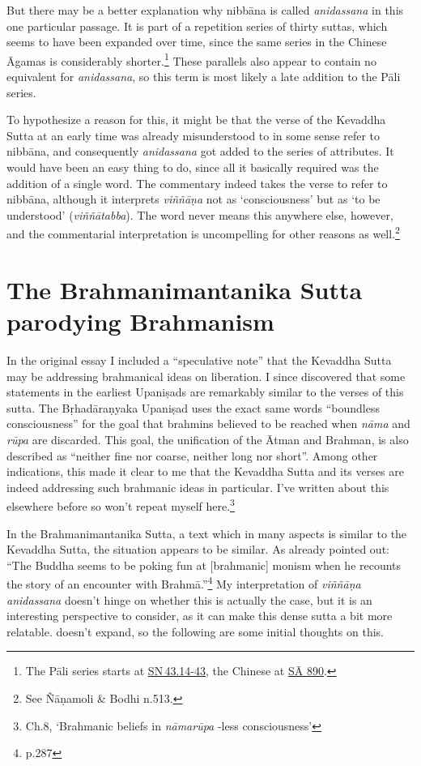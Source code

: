 \documentclass[10pt, openright]{book}
\begin{document}
But there may be a better explanation why nibbāna is called \textit{anidassana} in this one particular passage. It is part of a repetition series of thirty suttas, which seems to have been expanded over time, since the same series in the Chinese Āgamas is considerably shorter.\footnote {The Pāli series starts at \href{https://suttacentral.net/sn43.14-43/en/sujato}{SN 43.14-43}, the Chinese at \href{https://suttacentral.net/Sa890}{SĀ 890}.} These parallels also appear to contain no equivalent for \textit{anidassana}, so this term is most likely a late addition to the Pāli series.


To hypothesize a reason for this, it might be that the verse of the Kevaddha Sutta at an early time was already misunderstood to in some sense refer to nibbāna, and consequently \textit{anidassana} got added to the series of attributes. It would have been an easy thing to do, since all it basically required was the addition of a single word. The commentary indeed takes the verse to refer to nibbāna, although it interprets \textit{viññāṇa} not as ‘consciousness’ but as ‘to be understood’ (\textit{viññātabba}). The word never means this anywhere else, however, and the commentarial interpretation is uncompelling for other reasons as well.\footnote {See Ñāṇamoli \& Bodhi n.513.}




\section{The Brahmanimantanika Sutta parodying Brahmanism}
In the original essay I included a “speculative note” that the Kevaddha Sutta may be addressing brahmanical ideas on liberation. I since discovered that some statements in the earliest Upaniṣads are remarkably similar to the verses of this sutta. The Bṛhadāraṇyaka Upaniṣad uses the exact same words “boundless consciousness” for the goal that brahmins believed to be reached when \textit{nāma} and \textit{rūpa} are discarded. This goal, the unification of the Ātman and Brahman, is also described as “neither fine nor coarse, neither long nor short”. Among other indications, this made it clear to me that the Kevaddha Sutta and its verses are indeed addressing such brahmanic ideas in particular. I’ve written about this elsewhere before so won’t repeat myself here.\footnote {\cite{Sunyo 2024} Ch.8, ‘Brahmanic beliefs in \textit{nāmarūpa} -less consciousness’}


In the Brahmanimantanika Sutta, a text which in many aspects is similar to the Kevaddha Sutta, the situation appears to be similar. As \cite{Reat} already pointed out: “The Buddha seems to be poking fun at [brahmanic] monism when he recounts the story of an encounter with Brahmā.”\footnote {\cite{Reat} p.287} My interpretation of \textit{viññāṇa anidassana} doesn’t hinge on whether this is actually the case, but it is an interesting perspective to consider, as it can make this dense sutta a bit more relatable. \cite{Reat} doesn’t expand, so the following are some initial thoughts on this.
\end{document}
